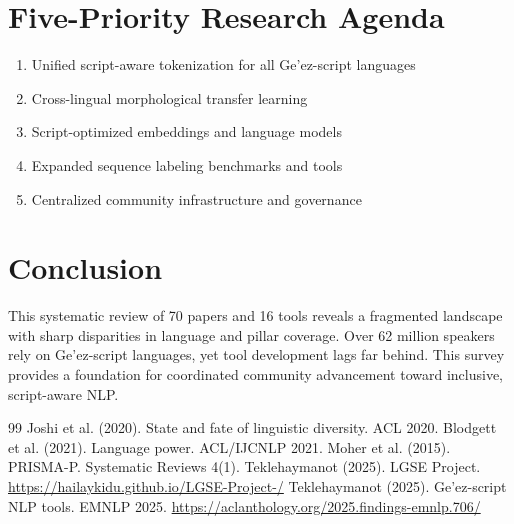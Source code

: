 \documentclass[12pt,a4paper]{article}
\theoremstyle{plain}
\theoremstyle{definition}
\begin{document}
\section{Five-Priority Research Agenda}

\begin{enumerate}
    \item Unified script-aware tokenization for all Ge'ez-script languages
    \item Cross-lingual morphological transfer learning
    \item Script-optimized embeddings and language models
    \item Expanded sequence labeling benchmarks and tools
    \item Centralized community infrastructure and governance
\end{enumerate}

\section{Conclusion}

This systematic review of 70 papers and 16 tools reveals a fragmented landscape with sharp disparities in language and pillar coverage. Over 62 million speakers rely on Ge'ez-script languages, yet tool development lags far behind. This survey provides a foundation for coordinated community advancement toward inclusive, script-aware NLP.

\begin{thebibliography}{99}
 Joshi et al. (2020). State and fate of linguistic diversity. ACL 2020.
 Blodgett et al. (2021). Language power. ACL/IJCNLP 2021.
 Moher et al. (2015). PRISMA-P. Systematic Reviews 4(1).
 Teklehaymanot (2025). LGSE Project. \url{https://hailaykidu.github.io/LGSE-Project-/}
 Teklehaymanot (2025). Ge'ez-script NLP tools. EMNLP 2025. \url{https://aclanthology.org/2025.findings-emnlp.706/}
\end{thebibliography}
\end{document}
